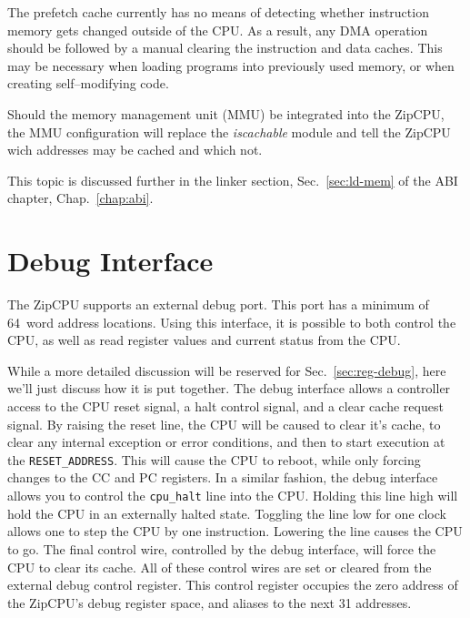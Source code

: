 \documentclass{gqtekspec}
\begin{document}
The prefetch cache currently has no means of detecting whether instruction
memory gets changed outside of the CPU.  As a result, any DMA operation should
be followed by a manual clearing the instruction and data caches.  This may
be necessary when loading programs into previously used memory, or when
creating self--modifying code.

Should the memory management unit (MMU) be integrated into the ZipCPU, the MMU
configuration will replace the {\em iscachable} module and tell the ZipCPU
wich addresses may be cached and which not.

This topic is discussed further in the linker section, Sec.~\ref{sec:ld-mem}
of the ABI chapter, Chap.~\ref{chap:abi}.

\section{Debug Interface}\label{sec:debug}
The ZipCPU supports an external debug port.  This port has a minimum of
64~word address locations.  Using this interface, it is possible to both
control the CPU, as well as read register values and current status from the
CPU.

While a more detailed discussion will be reserved for Sec.~\ref{sec:reg-debug},
here we'll just discuss how it is put together.  The debug interface allows
a controller access to the CPU reset signal, a halt control signal, and a
clear cache request signal.  By raising the reset line, the CPU will be caused
to clear it's cache, to clear any internal exception or error conditions, and
then to start execution at the {\tt RESET\_ADDRESS}.  This will cause the
CPU to reboot, while only forcing changes to the CC and PC registers.  In a
similar fashion, the debug interface allows you to control the {\tt cpu\_halt}
line into the CPU.  Holding this line high will hold the CPU in an externally
halted state.  Toggling the line low for one clock allows one to step the CPU
by one instruction.  Lowering the line causes the CPU to go.  The final control
wire, controlled by the debug interface, will force the CPU to clear its cache.
All of these control wires are set or cleared from the external debug control
register.  This control register occupies the zero address of the
ZipCPU's debug register space, and aliases to the next 31 addresses.
\end{document}
